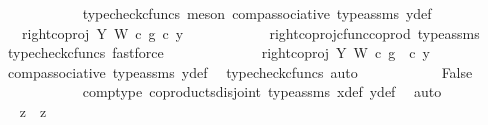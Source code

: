 \begin{isabellebody}
\ \ \ \ \ \ \ \ \ \ \isamarkupfalse%
\ {\isacharparenleft}{\kern0pt}typecheck{\isacharunderscore}{\kern0pt}cfuncs{\isacharcomma}{\kern0pt}\ meson\ comp{\isacharunderscore}{\kern0pt}associative{}\ type{\isacharunderscore}{\kern0pt}assms\ y{}{\isacharunderscore}{\kern0pt}def{\isacharparenright}{\kern0pt}\isanewline
\ \ \ \ \ \ \ \ \isamarkupfalse%
\ \isamarkupfalse%
\ {\isachardoublequoteopen}{\isachardot}{\kern0pt}{\isachardot}{\kern0pt}{\isachardot}{\kern0pt}\ {\isacharequal}{\kern0pt}\ {\isacharparenleft}{\kern0pt}right{\isacharunderscore}{\kern0pt}coproj\ Y\ W\ {\isasymcirc}\isactrlsub c\ g{\isacharparenright}{\kern0pt}\ {\isasymcirc}\isactrlsub c\ y{}{\isachardoublequoteclose}\isanewline
\ \ \ \ \ \ \ \ \ \ \isamarkupfalse%
\ right{\isacharunderscore}{\kern0pt}coproj{\isacharunderscore}{\kern0pt}cfunc{\isacharunderscore}{\kern0pt}coprod\ type{\isacharunderscore}{\kern0pt}assms\ \ \isamarkupfalse%
\ {\isacharparenleft}{\kern0pt}typecheck{\isacharunderscore}{\kern0pt}cfuncs{\isacharcomma}{\kern0pt}\ fastforce{\isacharparenright}{\kern0pt}\isanewline
\ \ \ \ \ \ \ \ \isamarkupfalse%
\ \isamarkupfalse%
\ {\isachardoublequoteopen}{\isachardot}{\kern0pt}{\isachardot}{\kern0pt}{\isachardot}{\kern0pt}\ {\isacharequal}{\kern0pt}\ right{\isacharunderscore}{\kern0pt}coproj\ Y\ W\ {\isasymcirc}\isactrlsub c\ g\ \ {\isasymcirc}\isactrlsub c\ y{}{\isachardoublequoteclose}\isanewline
\ \ \ \ \ \ \ \ \ \ \isamarkupfalse%
\ comp{\isacharunderscore}{\kern0pt}associative{}\ type{\isacharunderscore}{\kern0pt}assms{\isacharparenleft}{\kern0pt}{}{\isacharparenright}{\kern0pt}\ y{}{\isacharunderscore}{\kern0pt}def\ \isamarkupfalse%
\ {\isacharparenleft}{\kern0pt}typecheck{\isacharunderscore}{\kern0pt}cfuncs{\isacharcomma}{\kern0pt}\ auto{\isacharparenright}{\kern0pt}\isanewline
\ \ \ \ \ \ \ \ \isamarkupfalse%
\ \isamarkupfalse%
\ False\isanewline
\ \ \ \ \ \ \ \ \ \ \isamarkupfalse%
\ comp{\isacharunderscore}{\kern0pt}type\ coproducts{\isacharunderscore}{\kern0pt}disjoint\ type{\isacharunderscore}{\kern0pt}assms\ x{}{\isacharunderscore}{\kern0pt}def\ y{}{\isacharunderscore}{\kern0pt}def\ \isamarkupfalse%
\ auto\isanewline
\ \ \ \ \ \ \ \ \isamarkupfalse%
\ \isamarkupfalse%
\ {\isachardoublequoteopen}z{}\ {\isacharequal}{\kern0pt}\ z{}{\isachardoublequoteclose}\isanewline

\end{isabellebody}
